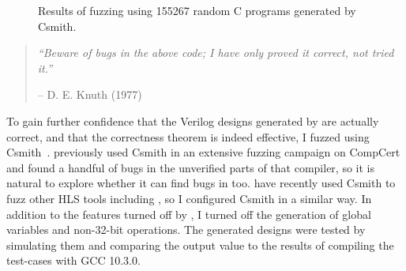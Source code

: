 \begin{figure}
  \centering

  \caption{Results of fuzzing \vericert{} using 155267 random C programs generated by Csmith.}\label{tab:fuzzing}
\end{figure}

\begin{quotation}
  \textit{\enquote{Beware of bugs in the above code; I have only proved it
      correct, not tried it.}}\par\hfill -- D. E. Knuth (1977)
\end{quotation}

\noindent To gain further confidence that the Verilog designs generated by
\vericert{} are actually correct, and that the correctness theorem is indeed
effective, I fuzzed \vericert{} using
Csmith~\cite{yang11_findin_under_bugs_c_compil}. \citeauthor{yang11_findin_under_bugs_c_compil}
previously used Csmith in an extensive fuzzing campaign on CompCert and found a
handful of bugs in the unverified parts of that compiler, so it is natural to
explore whether it can find bugs in \vericert{} too. \citet{herklotz21_esrhlst}
have recently used Csmith to fuzz other HLS tools including \legup{}, so I
configured Csmith in a similar way. In addition to the features turned off by
\citeauthor{herklotz21_esrhlst}, I turned off the generation of global variables
and non-32-bit operations. The generated designs were tested by simulating them
and comparing the output value to the results of compiling the test-cases with
GCC 10.3.0.

